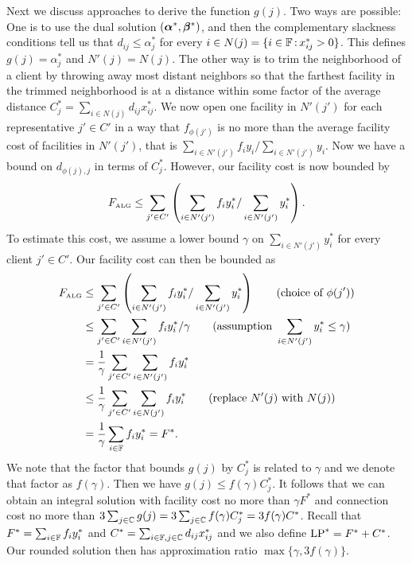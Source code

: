 \documentclass[oneside,final]{ucr}
\begin{document}
Next we discuss approaches to derive the function
$g(j)$. Two ways are possible: One is to use the dual
solution $(\boldsymbol{\alpha}^\ast, \boldsymbol{\beta}^\ast)$, and then the
complementary slackness conditions tell us that $d_{ij} \leq
\alpha_j^\ast$ for every $i \in N(j) = \{i\in\mathbb{F}
{\,:\,} x_{ij}^\ast > 0\}$. This defines $g(j) =
\alpha_j^\ast$ and $N'(j) = N(j)$. The other way is to trim
the neighborhood of a client by throwing away most distant
neighbors so that the farthest facility in the trimmed
neighborhood is at a distance within some factor of the
average distance $C_j^\ast = \sum_{i\in N(j)} d_{ij}
x_{ij}^\ast$. We now open one facility in $N'(j')$ for each
representative $j' \in C'$ in a way that $f_{\phi(j')}$ is
no more than the average facility cost of facilities in
$N'(j')$, that is $\sum_{i\in N'(j')} f_i y_i / \sum_{i \in
  N'(j')} y_i$. Now we have a bound on $d_{\phi(j),j}$ in
terms of $C_j^\ast$. However, our facility cost is now
bounded by
\begin{equation*}
  F_{\mbox{\tiny\rm ALG}} \leq \sum_{j'\in C'} \left(\sum_{i\in N'(j')} f_i y_i^\ast /
    \sum_{i\in N'(j')} y_i^\ast\right).
\end{equation*}
To estimate this cost, we assume a lower bound $\gamma$ on
$\sum_{i\in N'(j')} y_i^\ast$ for every client $j' \in C'$.
Our facility cost can then be bounded as
\begin{align*}
  F_{\mbox{\tiny\rm ALG}} &\leq \sum_{j'\in C'} \left(\sum_{i\in
      N'(j')} f_i y_i^\ast /
    \sum_{i\in N'(j')} y_i^\ast\right) \qquad (\text{choice
    of } \phi(j'))\\
  &\leq \sum_{j'\in C'}
  \sum_{i \in N'(j')} f_i y_i^\ast /\gamma \qquad
  (\text{assumption } \sum_{i\in N'(j')} y_i^\ast \leq \gamma)\\
  &= \frac{1}{\gamma} \sum_{j' \in C'} \sum_{i \in N'(j')}
  f_i y_i^\ast\\
  &\leq \frac{1}{\gamma} \sum_{j' \in C'} \sum_{i \in N(j')}
  f_i y_i^\ast \qquad (\text{replace } N'(j) \text{ with } N(j))\\
  &=
  \frac{1}{\gamma} \sum_{i \in \mathbb{F}} f_i y_i^\ast = F^\ast.\\
\end{align*}
We note that the factor that bounds $g(j)$ by $C_j^\ast$ is
related to $\gamma$ and we denote that factor as
$f(\gamma)$. Then we have $g(j) \leq f(\gamma) C_j^\ast$. It
follows that we can obtain an integral solution with
facility cost no more than $\gamma F^\ast$ and connection
cost no more than $3 \sum_{j\in \mathbb{C}} g(j) = 3
\sum_{j\in \mathbb{C}} f(\gamma) C_j^\ast = 3 f(\gamma)
C^\ast$. Recall that $F^\ast = \sum_{i\in \mathbb{F}} f_i
y_i^\ast$ and $C^\ast = \sum_{i\in\mathbb{F}, j\in\mathbb{C}}
d_{ij} x_{ij}^\ast$ and we also define $\mbox{\rm LP}^\ast = F^\ast +
C^\ast$. Our rounded solution then has approximation ratio
$\max\{\gamma, 3 f(\gamma)\}$.
\end{document}
